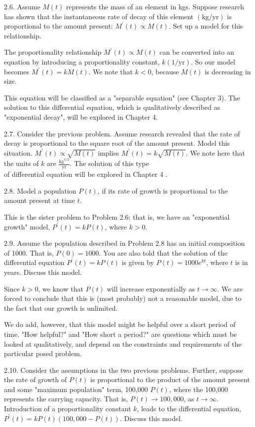 \documentclass[10pt]{article}
\begin{document}
2.6. Assume $M(t)$ represents the mass of an element in kgs. Suppose research has shown that the instantaneous rate of decay of this element $(\mathrm{kg} / \mathrm{yr})$ is proportional to the amount present: $M^{\prime}(t) \propto M(t)$. Set up a model for this relationship.

The proportionality relationship $M^{\prime}(t) \propto M(t)$ can be converted into an equation by introducing a proportionality constant, $k(1 / \mathrm{yr})$. So our model becomes $M^{\prime}(t)=k M(t)$. We note that $k<0$, because $M(t)$ is decreasing in size.

This equation will be classified as a "separable equation" (see Chapter 3). The solution to this differential equation, which is qualitatively described as "exponential decay", will be explored in Chapter 4.

2.7. Consider the previous problem. Assume research revealed that the rate of decay is proportional to the square root of the amount present. Model this situation. $M^{\prime}(t) \propto \sqrt{M(t)}$ implies $M^{\prime}(t)=k \sqrt{M(t)}$. We note here that the units of $k$ are $\frac{\mathrm{kg}^{1 / 2}}{\mathrm{yr}}$. The solution of this type\\
of differential equation will be explored in Chapter 4 .

2.8. Model a population $P(t)$, if its rate of growth is proportional to the amount present at time $t$.

This is the sister problem to Problem 2.6; that is, we have an "exponential growth" model, $P^{\prime}(t)=k P(t)$, where $k>0$.

2.9. Assume the population described in Problem 2.8 has an initial composition of 1000. That is, $P(0)=1000$. You are also told that the solution of the differential equation $P^{\prime}(t)=k P(t)$ is given by $P(t)=1000 e^{k t}$, where $t$ is in years. Discuss this model.

Since $k>0$, we know that $P(t)$ will increase exponentially as $t \rightarrow \infty$. We are forced to conclude that this is (most probably) not a reasonable model, due to the fact that our growth is unlimited.

We do add, however, that this model might be helpful over a short period of time. "How helpful?" and "How short a period?" are questions which must be looked at qualitatively, and depend on the constraints and requirements of the particular posed problem.

2.10. Consider the assumptions in the two previous problems. Further, suppose the rate of growth of $P(t)$ is proportional to the product of the amount present and some "maximum population" term, 100,000 $P(t)$, where the 100,000 represents the carrying capacity. That is, $P(t) \rightarrow 100,000$, as $t \rightarrow \infty$. Introduction of a proportionality constant $k$, leads to the differential equation, $P^{\prime}(t)=k P(t)(100,000-P(t))$. Discuss this model.
\end{document}
